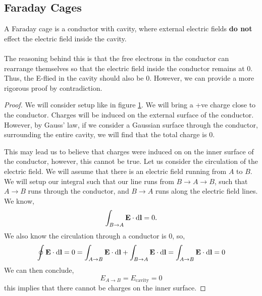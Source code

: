 \documentclass{book}
\begin{document}
\subsection{Faraday Cages}
A Faraday cage is a conductor with cavity, where external electric fields \textbf{do not} effect the electric field inside the cavity. \\\\
The reasoning behind this is that the free electrons in the conductor can rearrange themselves so that the electric field inside the conductor remains at 0. Thus, the E-flied in the cavity should also be 0. However, we can provide a more rigorous proof by contradiction.
\begin{proof}
    We will consider setup like in figure \ref{fig:cond2}. We will bring a +ve charge close to the conductor. Charges will be induced on the external surface of the conductor. However, by Gauss' law, if we consider a Gaussian surface through the conductor, surrounding the entire cavity, we will find that the total charge is 0. 
\begin{figure}[h]
        \centering
        \caption{}
        \label{fig:cond2}
    \end{figure}
This may lead us to believe that charges were induced on on the inner surface of the conductor, however, this cannot be true. Let us consider the circulation of the electric field. We will assume that there is an electric field running from $A$ to $B$. We will setup our integral such that our line runs from $B \to A \to B$, such that $A \to B$ runs through the conductor, and $B \to A$ runs along the electric field lines. We know,
\begin{equation}
    \int_{B\to A}\vb{E}\cdot\dd{\vb{l}} = 0.
\end{equation}
We also know the circulation through a conductor is 0, so,
\begin{equation}
    \oint \vb{E}\cdot \dd{\vb{l}} = 0 = \int_{A \to B} \vb{E}\cdot\dd{\vb{l}} + \int_{B \to A}\vb{E}
\cdot\dd{\vb{l}} = \int_{A\to B}\vb{E} \cdot \dd{\vb{l}} = 0\end{equation}
We can then conclude,
\begin{equation}
    E_{A\to B} = E_{\text{cavity}} = 0 
\end{equation}
this implies that there cannot be charges on the inner surface.
\end{proof}
\end{document}
